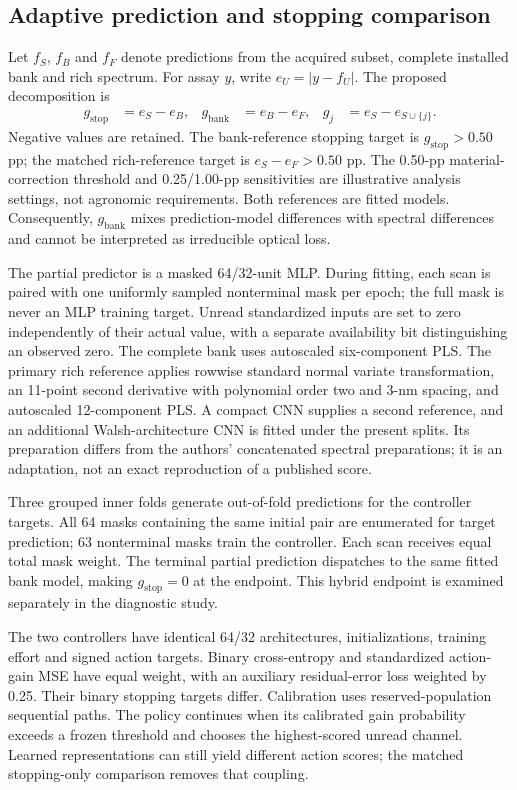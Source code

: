 \documentclass[Review,sagev,times]{sagej}
\begin{document}
\subsection{Adaptive prediction and stopping comparison}
Let $f_S$, $f_B$ and $f_F$ denote predictions from the acquired subset, complete installed bank and rich spectrum. For assay $y$, write $e_U=|y-f_U|$. The proposed decomposition is
\begin{align}
g_{\mathrm{stop}}&=e_S-e_B, & g_{\mathrm{bank}}&=e_B-e_F, &
g_j&=e_S-e_{S\cup\{j\}}.
\end{align}
Negative values are retained. The bank-reference stopping target is $g_{\mathrm{stop}}>0.50$ pp; the matched rich-reference target is $e_S-e_F>0.50$ pp. The 0.50-pp material-correction threshold and 0.25/1.00-pp sensitivities are illustrative analysis settings, not agronomic requirements. Both references are fitted models. Consequently, $g_{\mathrm{bank}}$ mixes prediction-model differences with spectral differences and cannot be interpreted as irreducible optical loss.

The partial predictor is a masked 64/32-unit MLP. During fitting, each scan is paired with one uniformly sampled nonterminal mask per epoch; the full mask is never an MLP training target. Unread standardized inputs are set to zero independently of their actual value, with a separate availability bit distinguishing an observed zero. The complete bank uses autoscaled six-component PLS. The primary rich reference applies rowwise standard normal variate transformation, an 11-point second derivative with polynomial order two and 3-nm spacing, and autoscaled 12-component PLS. A compact CNN supplies a second reference, and an additional Walsh-architecture CNN is fitted under the present splits.\citep{walsh2024,walshthesis2024} Its preparation differs from the authors' concatenated spectral preparations; it is an adaptation, not an exact reproduction of a published score.

Three grouped inner folds generate out-of-fold predictions for the controller targets. All 64 masks containing the same initial pair are enumerated for target prediction; 63 nonterminal masks train the controller. Each scan receives equal total mask weight. The terminal partial prediction dispatches to the same fitted bank model, making $g_{\mathrm{stop}}=0$ at the endpoint. This hybrid endpoint is examined separately in the diagnostic study.

The two controllers have identical 64/32 architectures, initializations, training effort and signed action targets. Binary cross-entropy and standardized action-gain MSE have equal weight, with an auxiliary residual-error loss weighted by 0.25. Their binary stopping targets differ. Calibration uses reserved-population sequential paths. The policy continues when its calibrated gain probability exceeds a frozen threshold and chooses the highest-scored unread channel. Learned representations can still yield different action scores; the matched stopping-only comparison removes that coupling.
\end{document}

